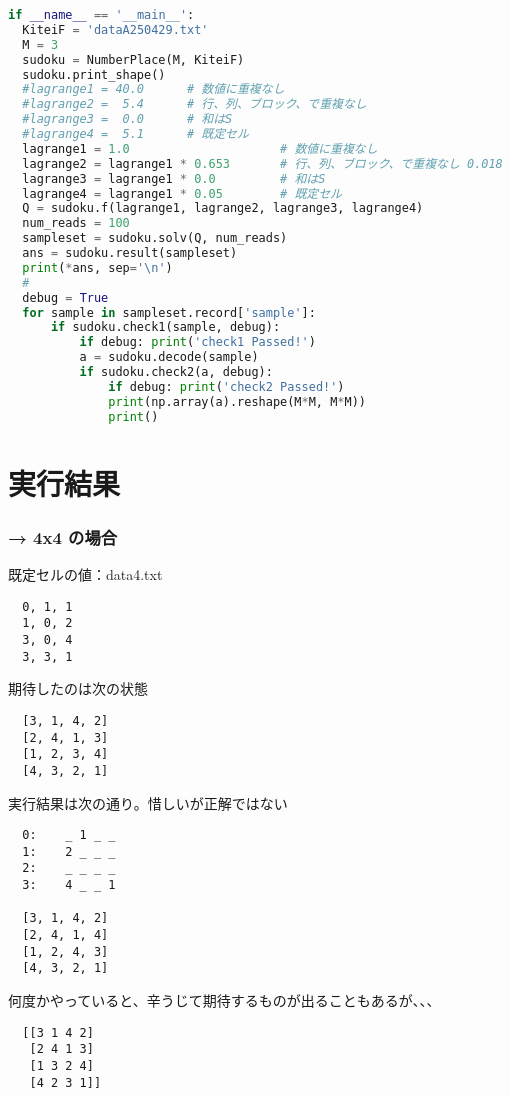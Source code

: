 \documentclass[uplatex,dvipdfmx,a4paper,11pt,oneside,openany]{jsbook}
\begin{document}
\begin{lstlisting}[language=Python]
if __name__ == '__main__':
  KiteiF = 'dataA250429.txt'
  M = 3
  sudoku = NumberPlace(M, KiteiF)
  sudoku.print_shape()
  #lagrange1 = 40.0      # 数値に重複なし
  #lagrange2 =  5.4      # 行、列、ブロック、で重複なし
  #lagrange3 =  0.0      # 和はS
  #lagrange4 =  5.1      # 既定セル
  lagrange1 = 1.0                     # 数値に重複なし
  lagrange2 = lagrange1 * 0.653       # 行、列、ブロック、で重複なし 0.018
  lagrange3 = lagrange1 * 0.0         # 和はS
  lagrange4 = lagrange1 * 0.05        # 既定セル
  Q = sudoku.f(lagrange1, lagrange2, lagrange3, lagrange4)
  num_reads = 100
  sampleset = sudoku.solv(Q, num_reads)
  ans = sudoku.result(sampleset)
  print(*ans, sep='\n')
  #
  debug = True
  for sample in sampleset.record['sample']:
      if sudoku.check1(sample, debug):
          if debug: print('check1 Passed!')
          a = sudoku.decode(sample)
          if sudoku.check2(a, debug):
              if debug: print('check2 Passed!')
              print(np.array(a).reshape(M*M, M*M))
              print()
\end{lstlisting}


\section{実行結果}

\subsubsection{→ 4x4 の場合}

既定セルの値：data4.txt
\begin{verbatim}
  0, 1, 1
  1, 0, 2
  3, 0, 4
  3, 3, 1
\end{verbatim}

期待したのは次の状態
\begin{verbatim}
  [3, 1, 4, 2]
  [2, 4, 1, 3]
  [1, 2, 3, 4]
  [4, 3, 2, 1]
\end{verbatim}

実行結果は次の通り。惜しいが正解ではない
\begin{verbatim}
  0:	_ 1 _ _
  1:	2 _ _ _
  2:	_ _ _ _
  3:	4 _ _ 1

  [3, 1, 4, 2]
  [2, 4, 1, 4]
  [1, 2, 4, 3]
  [4, 3, 2, 1]
\end{verbatim}

何度かやっていると、辛うじて期待するものが出ることもあるが、、、
\begin{verbatim}
  [[3 1 4 2]
   [2 4 1 3]
   [1 3 2 4]
   [4 2 3 1]]
\end{verbatim}
\end{document}

